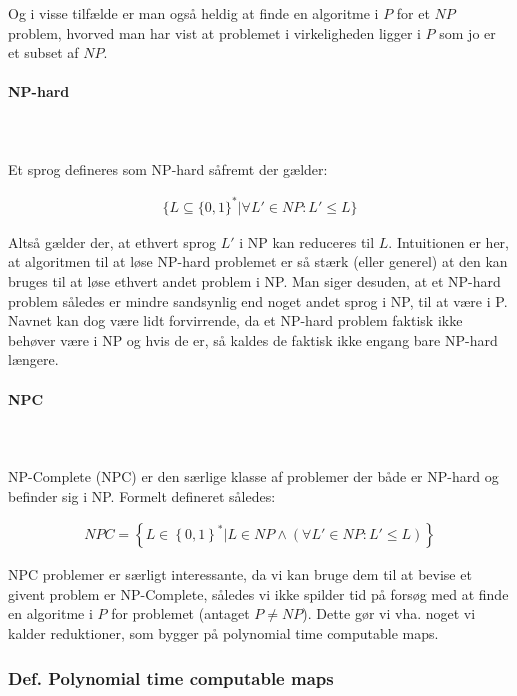 Og i visse tilfælde er man også heldig at finde en algoritme i $P$ for et $NP$ problem, hvorved man har vist at problemet i virkeligheden ligger i $P$ som jo er et subset af $NP$.

\paragraph{NP-hard}
~\\
~\\
Et sprog defineres som NP-hard såfremt der gælder:

\begin{align*}
 \lbrace L \subseteq \lbrace 0,1 \rbrace^* | \forall L' \in NP: L' \leq L \rbrace
\end{align*}

Altså gælder der, at ethvert sprog $L'$ i NP kan reduceres til $L$. Intuitionen er her, at algoritmen til at løse NP-hard problemet er så stærk (eller generel) at den kan bruges til at løse ethvert andet problem i NP. Man siger desuden, at et NP-hard problem således er mindre sandsynlig end noget andet sprog i NP, til at være i P.\\

Navnet kan dog være lidt forvirrende, da et NP-hard problem faktisk ikke behøver være i NP og hvis de er, så kaldes de faktisk ikke engang bare NP-hard længere.

\paragraph{NPC}
~\\
~\\
NP-Complete (NPC) er den særlige klasse af problemer der både er NP-hard og befinder sig i NP. Formelt defineret således: 

\begin{align*}
 NPC = \left\lbrace L \in \left\lbrace 0,1 \right\rbrace^* | L \in NP \wedge (\forall L' \in NP: L' \leq L) \right\rbrace
\end{align*}

NPC problemer er særligt interessante, da vi kan bruge dem til at bevise et givent problem er NP-Complete, således vi ikke spilder tid på forsøg med at finde en algoritme i $P$ for problemet (antaget $P\neq NP$). Dette gør vi vha. noget vi kalder reduktioner, som bygger på polynomial time computable maps.

\subsubsection{Def. Polynomial time computable maps}

